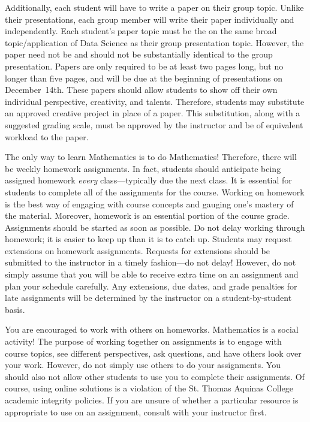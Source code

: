 \documentclass[11pt,letterpaper]{article}
\begin{document}
Additionally, each student will have to write a paper on their group topic. Unlike their presentations, each group member will write their paper individually and independently. Each student's paper topic must be the on the same broad topic/application of Data Science as their group presentation topic. However, the paper need not be and should not be substantially identical to the group presentation. Papers are only required to be at least two pages long, but no longer than five pages, and will be due at the beginning of presentations on December~14th. These papers should allow students to show off their own individual perspective, creativity, and talents. Therefore, students may substitute an approved creative project in place of a paper. This substitution, along with a suggested grading scale, must be approved by the instructor and be of equivalent workload to the paper.
\sectionbreak
 




\newpage




The only way to learn Mathematics is to do Mathematics! Therefore, there will be weekly homework assignments. In fact, students should anticipate being assigned homework {\itshape every} class---typically due the next class. It is essential for students to complete all of the assignments for the course. Working on homework is the best way of engaging with course concepts and gauging one's mastery of the material. Moreover, homework is an essential portion of the course grade. Assignments should be started as soon as possible. Do not delay working through homework; it is easier to keep up than it is to catch up. Students may request extensions on homework assignments. Requests for extensions should be submitted to the instructor in a timely fashion---do not delay! However, do not simply assume that you will be able to receive extra time on an assignment and plan your schedule carefully. Any extensions, due dates, and grade penalties for late assignments will be determined by the instructor on a student-by-student basis. \pspace

You are encouraged to work with others on homeworks. Mathematics is a social activity! The purpose of working together on assignments is to engage with course topics, see different perspectives, ask questions, and have others look over your work. However, do not simply use others to do your assignments. You should also not allow other students to use you to complete their assignments. Of course, using online solutions is a violation of the St. Thomas Aquinas College academic integrity policies. If you are unsure of whether a particular resource is appropriate to use on an assignment, consult with your instructor first. \sectionbreak
\end{document}

